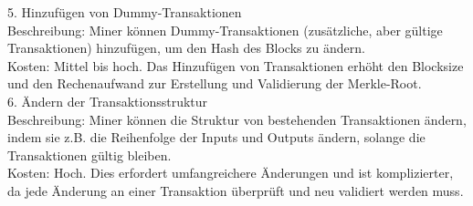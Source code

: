 \documentclass[german]{../uebung}
\begin{document}
\begin{exercise}{3}
    5. Hinzufügen von Dummy-Transaktionen\\
    Beschreibung: Miner können Dummy-Transaktionen (zusätzliche, aber gültige Transaktionen) hinzufügen, um den Hash des Blocks zu ändern.\\
    Kosten: Mittel bis hoch. Das Hinzufügen von Transaktionen erhöht den Blocksize und den Rechenaufwand zur Erstellung und Validierung der Merkle-Root.\\
    6. Ändern der Transaktionsstruktur\\
    Beschreibung: Miner können die Struktur von bestehenden Transaktionen ändern, indem sie z.B. die Reihenfolge der Inputs und Outputs ändern, solange die Transaktionen gültig bleiben.\\
    Kosten: Hoch. Dies erfordert umfangreichere Änderungen und ist komplizierter, da jede Änderung an einer Transaktion überprüft und neu validiert werden muss.
\end{exercise}
\end{document}
